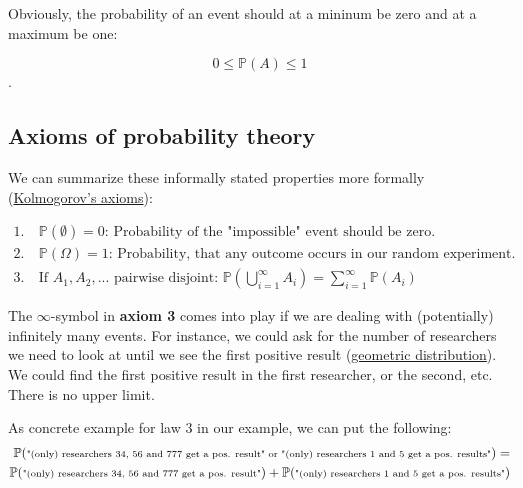 \documentclass[
]{book}
\begin{document}
Obviously, the probability of an event should at a mininum be zero and at a maximum be one:

\[0 \le \mathbb{P}(A) \le 1\].

\subsection{Axioms of probability theory}\label{axioms_of_probability_theory}

We can summarize these informally stated properties more formally (\href{https://altexploit.wordpress.com/wp-content/uploads/2017/07/a-n-kolmogorov-foundations-of-the-theory-of-probability-chelsea-pub-co-1960.pdf}{Kolmogorov's axioms}):

\begin{align}
1. &\ \mathbb{P}(\emptyset) = 0 \text{: Probability of the "impossible" event should be zero.}\\
2. &\ \mathbb{P}(\Omega) = 1 \text{: Probability, that any outcome occurs in our random experiment.}\\
3. &\ \text{If } A_1, A_2,... \text{ pairwise disjoint: } \mathbb{P}\left(\bigcup_{i=1}^{\infty} A_i\right) = \sum_{i=1}^{\infty} \mathbb{P}(A_i)
\end{align}

The \(\infty\)-symbol in \textbf{axiom 3} comes into play if we are dealing with (potentially) infinitely many events.
For instance, we could ask for the number of researchers we need to look at until we see the first
positive result (\href{https://en.wikipedia.org/wiki/Geometric_distribution}{geometric distribution}).
We could find the first positive result in the first researcher, or the second, etc. There is no upper limit.

As concrete example for law 3 in our example, we can put the following:
\begin{align}
\scriptsize \mathbb{P}(\text{"(only) researchers 34, 56 and 777 get a pos. result" or "(only) researchers 1 and 5 get a pos. results"}) =\\
\scriptsize \mathbb{P}(\text{"(only) researchers 34, 56 and 777 get a pos. result"}) + \mathbb{P}(\text{"(only) researchers 1 and 5 get a pos. results"})
\end{align}
\end{document}
